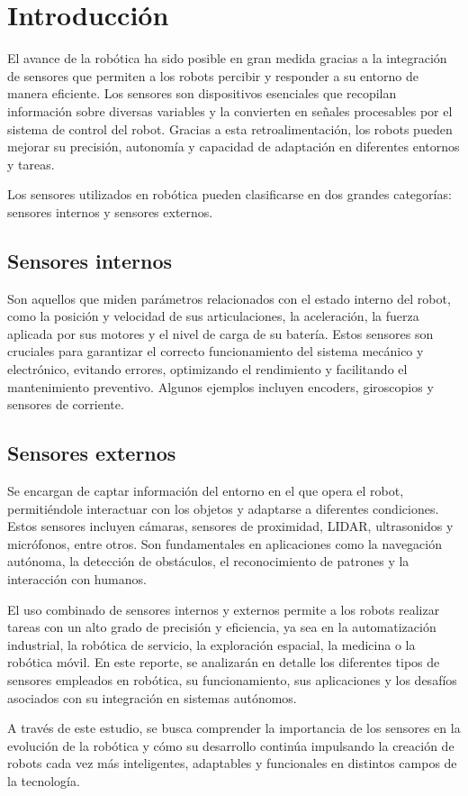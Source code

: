 \section{\textbf{Introducción}}

El avance de la robótica ha sido posible en gran medida gracias a la integración de sensores que permiten a los robots percibir y responder a su entorno de manera eficiente. Los sensores son dispositivos esenciales que recopilan información sobre diversas variables y la convierten en señales procesables por el sistema de control del robot. Gracias a esta retroalimentación, los robots pueden mejorar su precisión, autonomía y capacidad de adaptación en diferentes entornos y tareas.

Los sensores utilizados en robótica pueden clasificarse en dos grandes categorías: sensores internos y sensores externos.

\subsection*{\quad\textbf{Sensores internos}}
Son aquellos que miden parámetros relacionados con el estado interno del robot, como la posición y velocidad de sus articulaciones, la aceleración, la fuerza aplicada por sus motores y el nivel de carga de su batería. Estos sensores son cruciales para garantizar el correcto funcionamiento del sistema mecánico y electrónico, evitando errores, optimizando el rendimiento y facilitando el mantenimiento preventivo. Algunos ejemplos incluyen encoders, giroscopios y sensores de corriente.

\subsection*{\quad\textbf{Sensores externos}}
Se encargan de captar información del entorno en el que opera el robot, permitiéndole interactuar con los objetos y adaptarse a diferentes condiciones. Estos sensores incluyen cámaras, sensores de proximidad, LIDAR, ultrasonidos y micrófonos, entre otros. Son fundamentales en aplicaciones como la navegación autónoma, la detección de obstáculos, el reconocimiento de patrones y la interacción con humanos.

\vspace{0.5cm}

El uso combinado de sensores internos y externos permite a los robots realizar tareas con un alto grado de precisión y eficiencia, ya sea en la automatización industrial, la robótica de servicio, la exploración espacial, la medicina o la robótica móvil. En este reporte, se analizarán en detalle los diferentes tipos de sensores empleados en robótica, su funcionamiento, sus aplicaciones y los desafíos asociados con su integración en sistemas autónomos.

A través de este estudio, se busca comprender la importancia de los sensores en la evolución de la robótica y cómo su desarrollo continúa impulsando la creación de robots cada vez más inteligentes, adaptables y funcionales en distintos campos de la tecnología.
\pagebreak